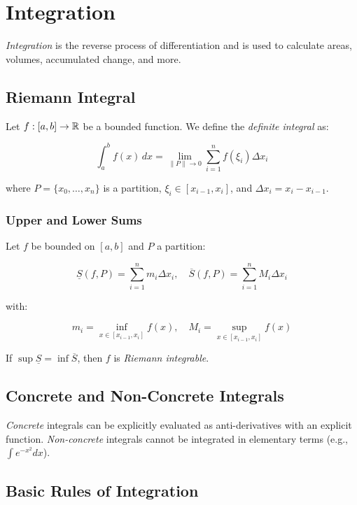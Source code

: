 \chapter{Integration}

\emph{Integration} is the reverse process of differentiation and is used to calculate areas, volumes, 
accumulated change, and more.

\section{Riemann Integral}

Let \(f: [a, b] \to \mathbb{R}\) be a bounded function. We define the \emph{definite integral} as:

\[
    \int_a^b f(x)\,dx = \lim_{\|P\| \to 0} \sum_{i=1}^n f(\xi_i)\Delta x_i
\]

where \(P = \{x_0, \dots, x_n\}\) is a partition, \(\xi_i \in [x_{i-1}, x_i]\), and 
\(\Delta x_i = x_i - x_{i-1}\).

\subsection{Upper and Lower Sums}

Let \(f\) be bounded on \([a, b]\) and \(P\) a partition:

\[
    \underline{S}(f, P) = \sum_{i=1}^n m_i \Delta x_i, \quad
    \overline{S}(f, P) = \sum_{i=1}^n M_i \Delta x_i
\]

with:

\[
    m_i = \inf_{x \in [x_{i-1}, x_i]} f(x), \quad
    M_i = \sup_{x \in [x_{i-1}, x_i]} f(x)
\]

If \(\sup \underline{S} = \inf \overline{S}\), then \(f\) is \emph{Riemann integrable}.

\section{Concrete and Non-Concrete Integrals}

\emph{Concrete} integrals can be explicitly evaluated as anti-derivatives with an explicit function. 
\emph{Non-concrete} integrals cannot be integrated in elementary terms (e.g., \(\int e^{-x^2} dx\)).

\section{Basic Rules of Integration}

